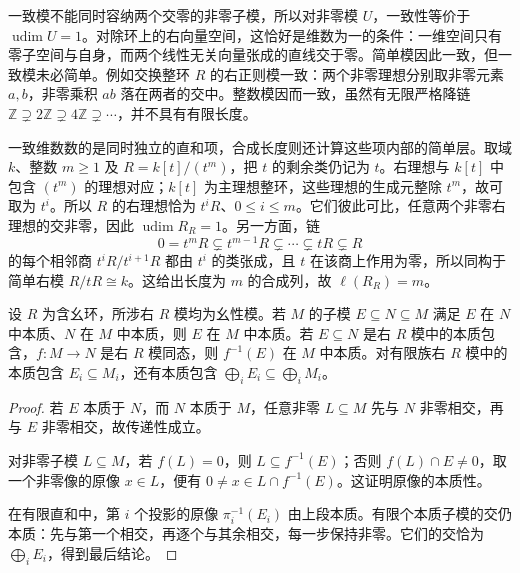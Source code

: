 \ProseParagraphBreak
一致模不能同时容纳两个交零的非零子模，所以对非零模 \(U\)，一致性等价于 \(\operatorname{udim}U=1\)。对除环上的右向量空间，这恰好是维数为一的条件：一维空间只有零子空间与自身，而两个线性无关向量张成的直线交于零。简单模因此一致，但一致模未必简单。例如交换整环 \(R\) 的右正则模一致：两个非零理想分别取非零元素 \(a,b\)，非零乘积 \(ab\) 落在两者的交中。整数模因而一致，虽然有无限严格降链 \(\mathbb Z\supsetneq2\mathbb Z\supsetneq4\mathbb Z\supsetneq\cdots\)，并不具有有限长度。

\ProseParagraphBreak
一致维数数的是同时独立的直和项，合成长度则还计算这些项内部的简单层。取域 \(k\)、整数 \(m\ge1\) 及 \(R=k[t]/(t^m)\)，把 \(t\) 的剩余类仍记为 \(t\)。右理想与 \(k[t]\) 中包含 \((t^m)\) 的理想对应；\(k[t]\) 为主理想整环，这些理想的生成元整除 \(t^m\)，故可取为 \(t^i\)。所以 \(R\) 的右理想恰为 \(t^iR\)、\(0\le i\le m\)。它们彼此可比，任意两个非零右理想的交非零，因此 \(\operatorname{udim}R_R=1\)。另一方面，链
\[
	0=t^mR\subsetneq t^{m-1}R\subsetneq\cdots\subsetneq tR\subsetneq R
\]
的每个相邻商 \(t^iR/t^{i+1}R\) 都由 \(t^i\) 的类张成，且 \(t\) 在该商上作用为零，所以同构于简单右模 \(R/tR\cong k\)。这给出长度为 \(m\) 的合成列，故 \(\ell(R_R)=m\)。

\begin{lemma}\label{b2:lem:essential-tools}
	设 \(R\) 为含幺环，所涉右 \(R\) 模均为幺性模。若 \(M\) 的子模 \(E\subseteq N\subseteq M\) 满足 \(E\) 在 \(N\) 中本质、\(N\) 在 \(M\) 中本质，则 \(E\) 在 \(M\) 中本质。若 \(E\subseteq N\) 是右 \(R\) 模中的本质包含，\(f:M\rightarrow N\) 是右 \(R\) 模同态，则 \(f^{-1}(E)\) 在 \(M\) 中本质。对有限族右 \(R\) 模中的本质包含 \(E_i\subseteq M_i\)，还有本质包含 \(\bigoplus_iE_i\subseteq\bigoplus_iM_i\)。
\end{lemma}
\begin{proof}
	若 \(E\) 本质于 \(N\)，而 \(N\) 本质于 \(M\)，任意非零 \(L\subseteq M\) 先与 \(N\) 非零相交，再与 \(E\) 非零相交，故传递性成立。

	对非零子模 \(L\subseteq M\)，若 \(f(L)=0\)，则 \(L\subseteq f^{-1}(E)\)；否则 \(f(L)\cap E\ne0\)，取一个非零像的原像 \(x\in L\)，便有 \(0\ne x\in L\cap f^{-1}(E)\)。这证明原像的本质性。

	在有限直和中，第 \(i\) 个投影的原像 \(\pi_i^{-1}(E_i)\) 由上段本质。有限个本质子模的交仍本质：先与第一个相交，再逐个与其余相交，每一步保持非零。它们的交恰为 \(\bigoplus_iE_i\)，得到最后结论。
\end{proof}

